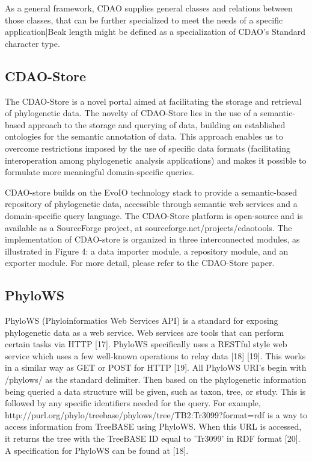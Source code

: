 \documentclass[10pt]{article}
\begin{document}
As a general framework, CDAO supplies general classes and relations between those classes, that can be further specialized to meet the needs of a specific application|Beak length might be defined as a specialization of CDAO's Standard character type.

\subsection{CDAO-Store}
The CDAO-Store is a novel portal aimed at facilitating the storage and retrieval of phylogenetic data. The novelty of CDAO-Store lies in the use of a semantic-based approach to the storage and querying of data, building on established ontologies for the semantic annotation of data. This approach enables us to overcome restrictions imposed by the use of specific data formats (facilitating interoperation among phylogenetic analysis applications) and makes it possible to formulate more meaningful domain-specific queries.

CDAO-store builds on the EvoIO technology stack to provide a semantic-based repository of phylogenetic data, accessible through semantic web services and a domain-specific query language. The CDAO-Store platform is open-source and is available as a SourceForge project, at sourceforge.net/projects/cdaotools.  The implementation of CDAO-store is organized in three interconnected modules, as illustrated in Figure 4: a data importer module, a repository module, and an exporter module.  For more detail, please refer to the CDAO-Store paper.

\subsection{PhyloWS}
PhyloWS (Phyloinformatics Web Services API) is a standard for exposing phylogenetic data as a web service. Web services are tools that can perform certain tasks via HTTP [17]. PhyloWS specifically uses a RESTful style web service which uses a few well-known operations to relay data [18] [19]. This works in a similar way as GET or POST for HTTP [19].  All PhyloWS URI's begin with /phylows/ as the standard delimiter. Then based on the phylogenetic information being queried a data structure will be given, such as taxon, tree, or study.  This is followed by any specific identifiers needed for the query. For example, http://purl.org/phylo/treebase/phylows/tree/TB2:Tr3099?format=rdf is a way to access information from TreeBASE using PhyloWS. When this URL is accessed, it returns the tree with the TreeBASE ID equal to 'Tr3099' in RDF format [20]. A specification for PhyloWS can be found at [18].
\end{document}
